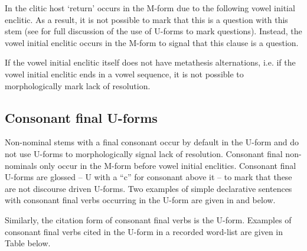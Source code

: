 In  the clitic host  `return'
occurs in the M-form due to the following vowel initial enclitic.
As a result, it is not possible to mark
that this is a question with this stem
(see  for full discussion of
the use of U-forms to mark questions).
Instead, the vowel initial enclitic occurs in the M-form
to signal that this clause is a question.

If the vowel initial enclitic itself does not have metathesis
alternations, i.e. if the vowel initial enclitic ends in a vowel sequence,
it is not possible to morphologically mark lack of resolution.

\subsection{Consonant final U-forms}\label{sec:ConFinVer}
Non-nominal stems with a final consonant occur by default in the U-form
and do not use U-forms to morphologically signal lack of resolution.
Consonant final non-nominals only occur in the M-form
before vowel initial enclitics.
Consonant final U-forms are glossed {\Uc}
-- U with a ``c'' for consonant above it --
to mark that these are not discourse driven U-forms.
Two examples of simple declarative sentences with consonant
final verbs occurring in the U-form
are given in  and  below.

\begin{exe}
	\label{ex2:120715-4, 0.05}
	\label{ex:130823-2, 0.57}
\end{exe}

Similarly, the citation form of consonant final verbs is the U-form.
Examples of consonant final verbs cited in the U-form in a recorded word-list
are given in Table  below.

